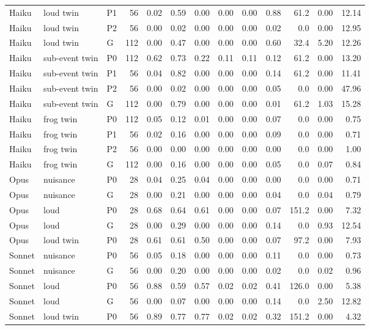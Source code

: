 \begin{tabular}{@{}lllrrrrrrrrrr@{}}
Haiku & loud twin & P1 & 56 & 0.02 & 0.59 & 0.00 & 0.00 & 0.00 & 0.88 & 61.2 & 0.00 & 12.14 \\
Haiku & loud twin & P2 & 56 & 0.00 & 0.02 & 0.00 & 0.00 & 0.00 & 0.02 & 0.0 & 0.00 & 12.95 \\
Haiku & loud twin & G & 112 & 0.00 & 0.47 & 0.00 & 0.00 & 0.00 & 0.60 & 32.4 & 5.20 & 12.26 \\
\addlinespace[1pt]
Haiku & sub-event twin & P0 & 112 & 0.62 & 0.73 & 0.22 & 0.11 & 0.11 & 0.12 & 61.2 & 0.00 & 13.20 \\
Haiku & sub-event twin & P1 & 56 & 0.04 & 0.82 & 0.00 & 0.00 & 0.00 & 0.14 & 61.2 & 0.00 & 11.41 \\
Haiku & sub-event twin & P2 & 56 & 0.00 & 0.02 & 0.00 & 0.00 & 0.00 & 0.05 & 0.0 & 0.00 & 47.96 \\
Haiku & sub-event twin & G & 112 & 0.00 & 0.79 & 0.00 & 0.00 & 0.00 & 0.01 & 61.2 & 1.03 & 15.28 \\
\addlinespace[1pt]
Haiku & frog twin & P0 & 112 & 0.05 & 0.12 & 0.01 & 0.00 & 0.00 & 0.07 & 0.0 & 0.00 & 0.75 \\
Haiku & frog twin & P1 & 56 & 0.02 & 0.16 & 0.00 & 0.00 & 0.00 & 0.09 & 0.0 & 0.00 & 0.71 \\
Haiku & frog twin & P2 & 56 & 0.00 & 0.00 & 0.00 & 0.00 & 0.00 & 0.00 & 0.0 & 0.00 & 1.00 \\
Haiku & frog twin & G & 112 & 0.00 & 0.16 & 0.00 & 0.00 & 0.00 & 0.05 & 0.0 & 0.07 & 0.84 \\
\addlinespace[1pt]
Opus & nuisance & P0 & 28 & 0.04 & 0.25 & 0.04 & 0.00 & 0.00 & 0.00 & 0.0 & 0.00 & 0.71 \\
Opus & nuisance & G & 28 & 0.00 & 0.21 & 0.00 & 0.00 & 0.00 & 0.04 & 0.0 & 0.04 & 0.79 \\
\addlinespace[1pt]
Opus & loud & P0 & 28 & 0.68 & 0.64 & 0.61 & 0.00 & 0.00 & 0.07 & 151.2 & 0.00 & 7.32 \\
Opus & loud & G & 28 & 0.00 & 0.29 & 0.00 & 0.00 & 0.00 & 0.14 & 0.0 & 0.93 & 12.54 \\
\addlinespace[1pt]
Opus & loud twin & P0 & 28 & 0.61 & 0.61 & 0.50 & 0.00 & 0.00 & 0.07 & 97.2 & 0.00 & 7.93 \\
\addlinespace[1pt]
Sonnet & nuisance & P0 & 56 & 0.05 & 0.18 & 0.00 & 0.00 & 0.00 & 0.11 & 0.0 & 0.00 & 0.73 \\
Sonnet & nuisance & G & 56 & 0.00 & 0.20 & 0.00 & 0.00 & 0.00 & 0.02 & 0.0 & 0.02 & 0.96 \\
\addlinespace[1pt]
Sonnet & loud & P0 & 56 & 0.88 & 0.59 & 0.57 & 0.02 & 0.02 & 0.41 & 126.0 & 0.00 & 5.38 \\
Sonnet & loud & G & 56 & 0.00 & 0.07 & 0.00 & 0.00 & 0.00 & 0.14 & 0.0 & 2.50 & 12.82 \\
\addlinespace[1pt]
Sonnet & loud twin & P0 & 56 & 0.89 & 0.77 & 0.77 & 0.02 & 0.02 & 0.32 & 151.2 & 0.00 & 4.32 \\
\bottomrule
\end{tabular}
